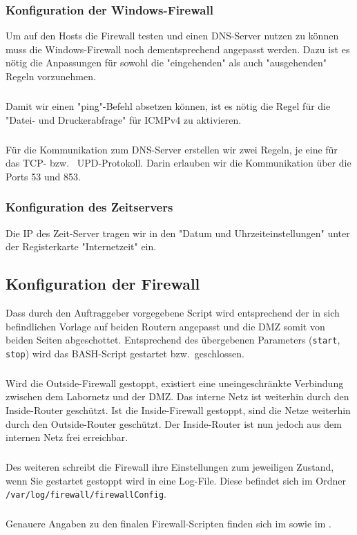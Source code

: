 \subsubsection{Konfiguration der Windows-Firewall}
\label{subsubsec:KonfigurationWinFirewall}
Um auf den Hosts die Firewall testen und einen DNS-Server nutzen zu können muss die Windows-Firewall noch dementsprechend angepasst werden.
Dazu ist es nötig die Anpassungen für sowohl die "eingehenden" als auch "ausgehenden" Regeln vorzunehmen.
\subparagraph*{} Damit wir einen "ping"-Befehl absetzen können, ist es nötig die Regel für die "Datei- und Druckerabfrage" für ICMPv4 zu aktivieren.
\subparagraph*{} Für die Kommunikation zum DNS-Server erstellen wir zwei Regeln, je eine für das TCP- bzw. \ UPD-Protokoll. Darin erlauben wir die Kommunikation über die Ports 53 und 853.

\subsubsection{Konfiguration des Zeitservers}
\label{subsubsec:KonfigurationWinNTP}
Die IP des Zeit-Server tragen wir in den "Datum und Uhrzeiteinstellungen" unter der Registerkarte "Internetzeit" ein.

\subsection{Konfiguration der Firewall}
\label{subsec:KonfigurationFirewall}
Dass durch den Auftraggeber vorgegebene Script wird entsprechend der in sich befindlichen Vorlage auf beiden Routern angepasst und die DMZ somit von beiden Seiten abgeschottet. Entsprechend des übergebenen Parameters (\verb+start+, \verb+stop+) wird das BASH-Script gestartet bzw.\ geschlossen.
\subparagraph*{} Wird die Outside-Firewall gestoppt, existiert eine uneingeschränkte Verbindung zwischen dem Labornetz und der DMZ. Das interne Netz ist weiterhin durch den Inside-Router geschützt. Ist die Inside-Firewall gestoppt, sind die Netze weiterhin durch den Outside-Router geschützt. Der Inside-Router ist nun jedoch aus dem internen Netz frei erreichbar.
\subparagraph*{} Des weiteren schreibt die Firewall ihre Einstellungen zum jeweiligen Zustand, wenn Sie gestartet \bzw gestoppt wird in eine Log-File. Diese befindet sich im Ordner \verb+/var/log/firewall/firewallConfig+.
\subparagraph*{}  Genauere Angaben zu den finalen Firewall-Scripten finden sich im  sowie im .

